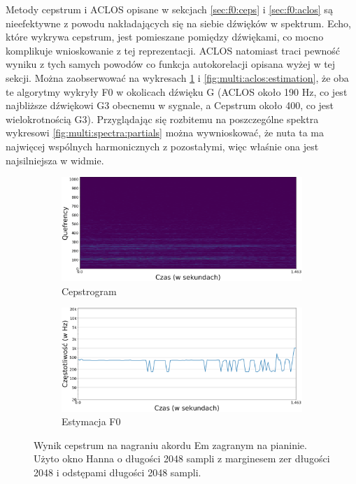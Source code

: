 \documentclass[12pt,a4paper,twoside]{mwart}
\begin{document}
Metody cepstrum i ACLOS opisane w sekcjach \ref{sec:f0:ceps} i \ref{sec:f0:aclos} są nieefektywne z powodu nakładających się na siebie dźwięków w spektrum. Echo, które wykrywa cepstrum, jest pomieszane pomiędzy dźwiękami, co mocno komplikuje wnioskowanie z tej reprezentacji. ACLOS natomiast traci pewność wyniku z tych samych powodów co funkcja autokorelacji opisana wyżej w tej sekcji. Można zaobserwować na wykresach \ref{fig:multi:ceps:estimation} i \ref{fig:multi:aclos:estimation}, że oba te algorytmy wykryły F0 w okolicach dźwięku G (ACLOS około 190 Hz, co jest najbliższe dźwiękowi G3 obecnemu w sygnale, a Cepstrum około 400, co jest wielokrotnością G3). Przyglądając się rozbitemu na poszczególne spektra wykresowi \ref{fig:multi:spectra:partials} można wywnioskować, że nuta ta ma najwięcej wspólnych harmonicznych z pozostałymi, więc właśnie ona jest najsilniejsza w widmie.

\begin{figure}[H]
  \begin{subfigure}{0.5\textwidth}
    \includegraphics[width=1.\linewidth]{images/Em/cepstrogram_cropped.png}
    \caption{Cepstrogram}
  \end{subfigure}
  \begin{subfigure}{0.49\textwidth}
    \includegraphics[width=1.\linewidth]{images/Em/cepstra_estimation_cropped.png}
    \caption{Estymacja F0}
    \label{fig:multi:ceps:estimation}
  \end{subfigure}
  \caption{Wynik cepstrum na nagraniu akordu Em zagranym na pianinie. Użyto okno Hanna o długości 2048 sampli z marginesem zer długości 2048 i odstępami długości 2048 sampli.}
  \label{fig:multi:ceps}
\end{figure}
\end{document}
